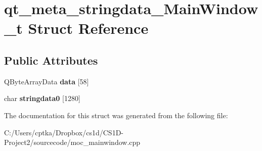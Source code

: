 \hypertarget{structqt__meta__stringdata___main_window__t}{}\section{qt\+\_\+meta\+\_\+stringdata\+\_\+\+Main\+Window\+\_\+t Struct Reference}
\label{structqt__meta__stringdata___main_window__t}
\subsection*{Public Attributes}
\begin{DoxyCompactItemize}
\item 
\mbox{\label{structqt__meta__stringdata___main_window__t_ad10b8031cf6571bb2f0d30f1e80302b6}} 
Q\+Byte\+Array\+Data {\bfseries data} \mbox{[}58\mbox{]}
\item 
\mbox{\label{structqt__meta__stringdata___main_window__t_a632c6d30417559875951adf377c861ee}} 
char {\bfseries stringdata0} \mbox{[}1280\mbox{]}
\end{DoxyCompactItemize}


The documentation for this struct was generated from the following file\+:\begin{DoxyCompactItemize}
\item 
C\+:/\+Users/cptka/\+Dropbox/cs1d/\+C\+S1\+D-\/\+Project2/sourcecode/moc\+\_\+mainwindow.\+cpp\end{DoxyCompactItemize}
